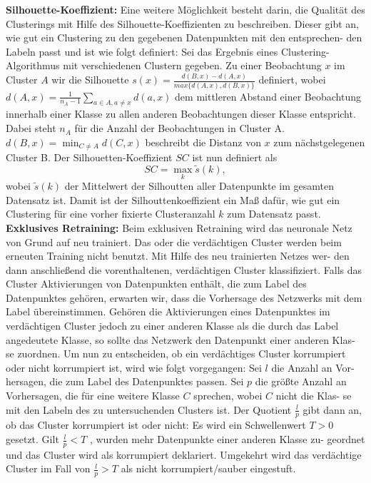 \documentclass[11pt,a4paper]{article}
\numberwithin{equation}{section}
\begin{document}
	\noindent \textbf{Silhouette-Koeffizient:} Eine weitere Möglichkeit besteht darin, die Qualität
	des Clusterings mit Hilfe des Silhouette-Koeffizienten zu beschreiben. Dieser gibt
	an, wie gut ein Clustering zu den gegebenen Datenpunkten mit den entsprechen-
	den Labeln passt und ist wie folgt definiert: Sei das Ergebnis eines Clustering-
	Algorithmus mit verschiedenen Clustern gegeben. Zu einer Beobachtung $x$ im Cluster $A$ wir die Silhouette $s(x) = \frac{d(B,x)-d(A,x)}{max\lbrace d(A,x), d(B,x) \rbrace}$ definiert, wobei $d(A,x)  = \frac{1}{n_A -1}\sum_{a \in A, a \neq x}{d(a,x)}$ dem mittleren Abstand einer Beobachtung innerhalb einer Klasse zu allen anderen Beobachtungen dieser Klasse entspricht.
	Dabei steht $n_A$ für die Anzahl der Beobachtungen in Cluster A. $d(B,x) = \min_{C \neq A}d(C,x)$ beschreibt die Distanz von $x$ zum nächstgelegenen Cluster B. Der Silhouetten-Koeffizient $SC$ ist nun definiert als
	\begin{equation}
	SC = \max_k \tilde{s}(k),
	\end{equation}
	wobei $\tilde{s}(k)$ der Mittelwert der Silhoutten aller Datenpunkte im gesamten Datensatz ist. Damit ist der Silhouttenkoeffizient ein Maß dafür, wie gut ein Clustering für eine vorher fixierte Clusteranzahl $k$ zum Datensatz passt.\\
	
	\noindent \textbf{Exklusives Retraining:} Beim exklusiven Retraining wird das neuronale Netz
	von Grund auf neu trainiert. Das oder die verdächtigen Cluster werden beim
	erneuten Training nicht benutzt. Mit Hilfe des neu trainierten Netzes wer-
	den dann anschließend die vorenthaltenen, verdächtigen Cluster klassifiziert.
	Falls das Cluster Aktivierungen von Datenpunkten enthält, die zum Label des
	Datenpunktes gehören, erwarten wir, dass die Vorhersage des Netzwerks mit
	dem Label übereinstimmen. Gehören die Aktivierungen eines Datenpunktes im
	verdächtigen Cluster jedoch zu einer anderen Klasse als die durch das Label
	angedeutete Klasse, so sollte das Netzwerk den Datenpunkt einer anderen Klas-
	se zuordnen. Um nun zu entscheiden, ob ein verdächtiges Cluster korrumpiert
	oder nicht korrumpiert ist, wird wie folgt vorgegangen: Sei $l$ die Anzahl an Vor-
	hersagen, die zum Label des Datenpunktes passen. Sei $p$ die größte Anzahl an
	Vorhersagen, die für eine weitere Klasse $C$ sprechen, wobei $C$ nicht die Klas-
	se mit den Labeln des zu untersuchenden Clusters ist. Der Quotient $\frac{l}{p}$ gibt
	dann an, ob das Cluster korrumpiert ist oder nicht: Es wird ein Schwellenwert
	$T > 0$ gesetzt. Gilt $\frac{l}{p} < T$ , wurden mehr Datenpunkte einer anderen Klasse zu-
	geordnet und das Cluster wird als korrumpiert deklariert. Umgekehrt wird das
	verdächtige Cluster im Fall von $\frac{l}{p} > T$ als nicht korrumpiert/sauber eingestuft.
	
\end{document}
